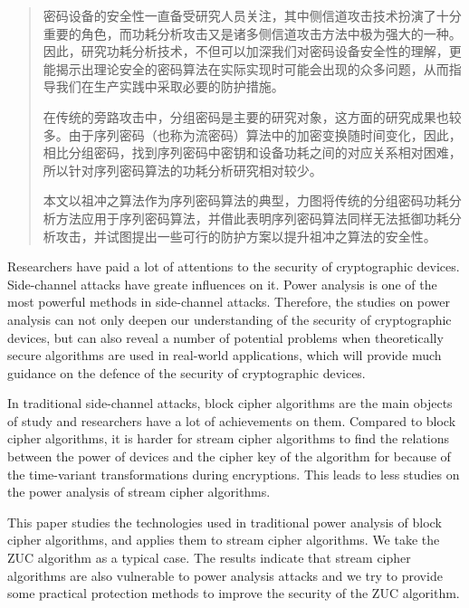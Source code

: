 
\begin{abstract}

密码设备的安全性一直备受研究人员关注，其中侧信道攻击技术扮演了十分重要的角色，而功耗分析攻击又是诸多侧信道攻击方法中极为强大的一种。因此，研究功耗分析技术，不但可以加深我们对密码设备安全性的理解，更能揭示出理论安全的密码算法在实际实现时可能会出现的众多问题，从而指导我们在生产实践中采取必要的防护措施。

在传统的旁路攻击中，分组密码是主要的研究对象，这方面的研究成果也较多。由于序列密码（也称为流密码）算法中的加密变换随时间变化，因此，相比分组密码，找到序列密码中密钥和设备功耗之间的对应关系相对困难，所以针对序列密码算法的功耗分析研究相对较少。

本文以祖冲之算法作为序列密码算法的典型，力图将传统的分组密码功耗分析方法应用于序列密码算法，并借此表明序列密码算法同样无法抵御功耗分析攻击，并试图提出一些可行的防护方案以提升祖冲之算法的安全性。

\end{abstract}

\begin{englishabstract}
Researchers have paid a lot of attentions to the security of cryptographic devices. Side-channel attacks have greate influences on it. Power analysis is one of the most powerful methods in side-channel attacks. Therefore, the studies on power analysis can not only deepen our understanding of the security of cryptographic devices, but can also reveal a number of potential problems when theoretically secure algorithms are used in real-world applications, which will provide much guidance on the defence of the security of cryptographic devices.

In traditional side-channel attacks, block cipher algorithms are the main objects of study and researchers have a lot of achievements on them. Compared to block cipher algorithms, it is harder for stream cipher algorithms to find the relations between the power of devices and the cipher key of the algorithm for because of the time-variant transformations during encryptions. This leads to less studies on the power analysis of stream cipher algorithms.

This paper studies the technologies used in traditional power analysis of block cipher algorithms, and applies them to stream cipher algorithms. We take the ZUC algorithm as a typical case. The results indicate that stream cipher algorithms are also vulnerable to power analysis attacks and we try to provide some practical protection methods to improve the security of the ZUC algorithm.

\end{englishabstract}


